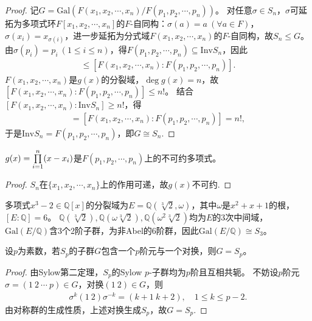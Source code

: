 \documentclass[../../main.tex]{subfiles}%
\begin{document}
\begin{proof}

记$G=\mathrm{Gal}(F(x_1,x_2,\cdots,x_n)/F(p_1,p_2,\cdots,p_n))$。
对任意$\sigma\in S_n$，$\sigma$可延拓为多项式环$F[x_1,x_2,\cdots,x_n]$的$F$-自同构：$\sigma(a)=a\ (\forall a\in F)$，$\sigma(x_i)=x_{\sigma(i)}$，进一步延拓为分式域$F(x_1,x_2,\cdots,x_n)$的$F$-自同构，故$S_n\leqslant G$。
由$\sigma(p_i)=p_i\ (1\leqslant i\leqslant n)$，得$F(p_1,p_2,\cdots,p_n)\subseteq \mathrm{Inv}S_n$，因此
\begin{align*}
[F(x_1,x_2,\cdots,x_n):\mathrm{Inv}S_n]\leqslant [F(x_1,x_2,\cdots,x_n):F(p_1,p_2,\cdots,p_n)].
\end{align*}
$F(x_1,x_2,\cdots,x_n)$是$g(x)$的分裂域，$\deg g(x)=n$，故$[F(x_1,x_2,\cdots,x_n):F(p_1,p_2,\cdots,p_n)]\leqslant n!$。
结合$[F(x_1,x_2,\cdots,x_n):\mathrm{Inv}S_n]\geqslant n!$，得
\begin{align*}
[F(x_1,x_2,\cdots,x_n):\mathrm{Inv}S_n]=[F(x_1,x_2,\cdots,x_n):F(p_1,p_2,\cdots,p_n)]=n!,
\end{align*}
于是$\mathrm{Inv}S_n=F(p_1,p_2,\cdots,p_n)$，即$G\cong S_n$.

\end{proof}

\begin{corollary}
$g(x)=\prod\limits_{i=1}^n\limits (x-x_i)$是$F(p_1,p_2,\cdots,p_n)$上的不可约多项式。
\end{corollary}

\begin{proof}

$S_n$在$\{x_1,x_2,\cdots,x_n\}$上的作用可递，故$g(x)$不可约.

\end{proof}

\begin{example}
多项式$x^3-2\in\mathbb{Q}[x]$的分裂域为$E=\mathbb{Q}(\sqrt[3]{2},\omega)$，其中$\omega$是$x^2+x+1$的根，$[E:\mathbb{Q}]=6$。
$\mathbb{Q}(\sqrt[3]{2}),\mathbb{Q}(\omega\sqrt[3]{2}),\mathbb{Q}(\omega^2\sqrt[3]{2})$均为$E$的3次中间域，$\mathrm{Gal}(E/\mathbb{Q})$含3个2阶子群，为非Abel的6阶群，因此$\mathrm{Gal}(E/\mathbb{Q})\cong S_3$。
\end{example}

\begin{lemma}
设$p$为素数，若$S_p$的子群$G$包含一个$p$阶元与一个对换，则$G=S_p$。
\end{lemma}

\begin{proof}

由Sylow第二定理，$S_p$的Sylow $p$-子群均为$p$阶且互相共轭。
不妨设$p$阶元$\sigma=(1\ 2\ \cdots\ p)\in G$，对换$(1\ 2)\in G$，则
\begin{align*}
\sigma^k(1\ 2)\sigma^{-k}=(k+1\ k+2),\quad 1\leqslant k\leqslant p-2.
\end{align*}
由对称群的生成性质，上述对换生成$S_p$，故$G=S_p$.

\end{proof}
\end{document}
